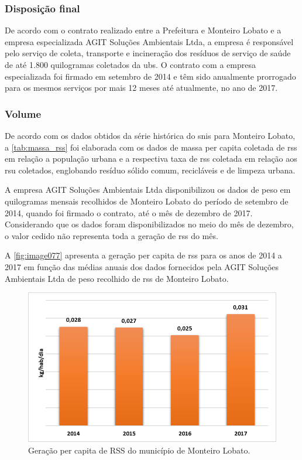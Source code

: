 	\subsubsection{Disposição final}
	
	De acordo com o contrato realizado entre a Prefeitura e Monteiro Lobato e a empresa especializada AGIT Soluções Ambientais Ltda, a empresa é responsável pelo serviço de coleta, transporte e incineração dos resíduos de serviço de saúde de até 1.800 quilogramas coletados da \gls{ubs}.
	O contrato com a empresa especializada foi firmado em setembro de 2014 e têm sido anualmente prorrogado para os mesmos serviços por mais 12 meses até atualmente, no ano de 2017.
	
	\subsubsection{Volume}
	De acordo com os dados obtidos da série histórica do \gls{snis} para Monteiro Lobato, a \autoref{tab:massa_rss} foi elaborada com os dados de massa per capita coletada de \gls{rss} em relação a população urbana e a respectiva taxa de \gls{rss} coletada em relação aos \gls{rsu} coletados, englobando resíduo sólido comum, recicláveis e de limpeza urbana.
	
	
	
	A empresa AGIT Soluções Ambientais Ltda disponibilizou os dados de peso em quilogramas mensais recolhidos de Monteiro Lobato do período de setembro de 2014, quando foi firmado o contrato, até o mês de dezembro de 2017. Considerando que os dados foram disponibilizados no meio do mês de dezembro, o valor cedido não representa toda a geração de \gls{rss} do mês.
	
	A \autoref{fig:image077} apresenta a geração per capita de \gls{rss} para os anos de 2014 a 2017 em função das médias anuais dos dados fornecidos pela AGIT Soluções Ambientais Ltda de peso recolhido de \gls{rss} de Monteiro Lobato.
	
	\begin{figure}
		\centering
		\includegraphics[width=0.75\linewidth]{produtos/prodtres/image077}
		\caption{Geração per capita de RSS do município de Monteiro Lobato.}
		\label{fig:image077}
	\end{figure}
	
